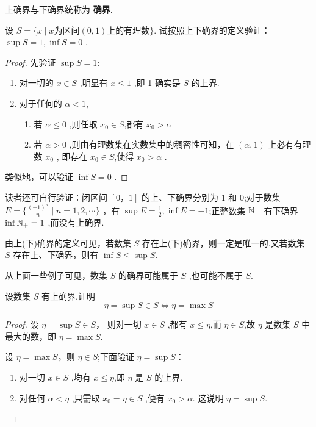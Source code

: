 上确界与下确界统称为 \textbf{确界}.

\begin{example}
    设 $S=\{ x \mid x \mbox{为区间} (0,1) \mbox{上的有理数} \}$. 试按照上下确界的定义验证： $\sup S =1,\inf S=0$ .
\end{example}

\begin{proof}
    \renewcommand{\theenumi}{\roman{enumi}}
    \renewcommand{\labelenumi}{\normalfont (\theenumi)}
    先验证 $\sup S=1$:
    \begin{enumerate}
        \item 对一切的 $x\in S$ ,明显有 $x\le 1$ ,即 1 确实是 $S$ 的上界.
        \item 对于任何的 $\alpha <1$, 
        \begin{enumerate}
            \item[\textbullet] 若 $\alpha \le 0$ ,则任取 $x_0 \in S$,都有 $x_0>\alpha$
            \item[\textbullet] 若 $\alpha>0$ ,则由有理数集在实数集中的稠密性可知，在 $(\alpha,1)$ 上必有有理数 $x_0$ , 即存在 $x_0 \in S$,使得 $x_0>\alpha$ .
        \end{enumerate}
    \end{enumerate}

    类似地，可以验证 $\inf S=0$ .
\end{proof}

读者还可自行验证：闭区间 $[0，1]$ 的上、下确界分别为 1 和 0;对于数集 $E=\{\frac{(-1)^n}{n} \mid n=1,2,\cdots\}$ ，有 $\sup E=\frac{1}{2},\inf E =-1$;正整数集 $\mathbb{N}_+$ 有下确界 $\inf \mathbb{N}_+=1$ ,而没有上确界.

\begin{annotation}
    由上(下)确界的定义可见，若数集 $S$ 存在上(下)确界，则一定是唯一的.又若数集 $S$ 存在上、下确界，则有 $\inf S \le \sup S$.
\end{annotation}
\begin{annotation}
    从上面一些例子可见，数集 $S$ 的确界可能属于 $S$ ,也可能不属于 $S$.
\end{annotation}

\begin{example}[确界与最值]
    设数集 $S$ 有上确界.证明
    \[
    \eta = \sup S \in S \iff \eta = \max S
    \]
\end{example}

\begin{proof}
    \renewcommand{\theenumi}{\roman{enumi}}
    \renewcommand{\labelenumi}{\normalfont (\theenumi)}
    \biyao 设 $\eta = \sup S \in S$， 则对一切 $x\in S$ ,都有 $x\le \eta$,而 $\eta\in S$,故 $\eta$ 是数集 $S$ 中最大的数，即 $\eta=\max S$.

    \chongfen 设 $\eta=\max S$，则 $\eta\in S$;下面验证 $\eta = \sup S$：
    \begin{enumerate}
        \item 对一切 $x \in S$ ,均有 $x\le \eta$,即 $\eta$ 是 $S$ 的上界.
        \item 对任何 $\alpha < \eta$ ,只需取 $x_0=\eta\in S$ ,便有 $x_0>\alpha$. 这说明 $\eta=\sup S$.
    \end{enumerate}
\end{proof}

